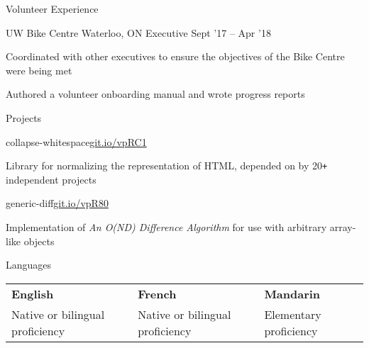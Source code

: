 \documentclass{resume} %
\begin{document}

\begin{rSection}{Volunteer Experience}
  \begin{rSubsection}{UW Bike Centre}
                     {Waterloo, ON}
                     {Executive}
                     {Sept '17 -- Apr '18}
    \item Coordinated with other executives to ensure the objectives of the Bike Centre were being met
    \item Authored a volunteer onboarding manual and wrote progress reports
  \end{rSubsection}
\end{rSection}


\begin{rSection}{Projects}
  \begin{rSubsection}{collapse-whitespace}{\href{https://git.io/vpRC1}{git.io/vpRC1}}{}{}
    \item Library for normalizing the representation of HTML, depended on by 20\texttt{+} independent projects
  \end{rSubsection}

  \begin{rSubsection}{generic-diff}{\href{https://git.io/vpR80}{git.io/vpR80}}{}{}
    \item Implementation of \textit{An O(ND) Difference Algorithm} for use with arbitrary array-like objects
  \end{rSubsection}
\end{rSection}


\begin{rSection}{Languages}
  \setlength\tabcolsep{0pt}
  \begin{tabu} to \textwidth {X[l] X[l] l}
    \textbf{English} & \textbf{French} & \textbf{Mandarin} \\
    Native or bilingual proficiency & Native or bilingual proficiency & Elementary proficiency
  \end{tabu}
\end{rSection}
\end{document}
